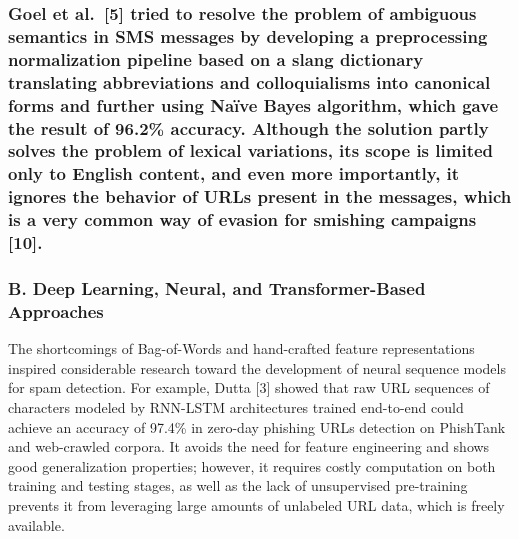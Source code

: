 \subsubsection{Goel et al.~{[}5{]} tried to resolve the problem of
ambiguous semantics in SMS messages by developing a preprocessing
normalization pipeline based on a slang dictionary translating
abbreviations and colloquialisms into canonical forms and further using
Naïve Bayes algorithm, which gave the result of 96.2\% accuracy.
Although the solution partly solves the problem of lexical variations,
its scope is limited only to English content, and even more importantly,
it ignores the behavior of URLs present in the messages, which is a very
common way of evasion for smishing campaigns
{[}10{]}.}\label{goel-et-al.-5-tried-to-resolve-the-problem-of-ambiguous-semantics-in-sms-messages-by-developing-a-preprocessing-normalization-pipeline-based-on-a-slang-dictionary-translating-abbreviations-and-colloquialisms-into-canonical-forms-and-further-using-nauxefve-bayes-algorithm-which-gave-the-result-of-96.2-accuracy.-although-the-solution-partly-solves-the-problem-of-lexical-variations-its-scope-is-limited-only-to-english-content-and-even-more-importantly-it-ignores-the-behavior-of-urls-present-in-the-messages-which-is-a-very-common-way-of-evasion-for-smishing-campaigns-10.}

\subsubsection{}\label{section}

\subsubsection{B. Deep Learning, Neural, and Transformer-Based
Approaches}\label{b.-deep-learning-neural-and-transformer-based-approaches}

The shortcomings of Bag-of-Words and hand-crafted feature
representations inspired considerable research toward the development of
neural sequence models for spam detection. For example, Dutta {[}3{]}
showed that raw URL sequences of characters modeled by RNN-LSTM
architectures trained end-to-end could achieve an accuracy of 97.4\% in
zero-day phishing URLs detection on PhishTank and web-crawled corpora.
It avoids the need for feature engineering and shows good generalization
properties; however, it requires costly computation on both training and
testing stages, as well as the lack of unsupervised pre-training
prevents it from leveraging large amounts of unlabeled URL data, which
is freely available.

